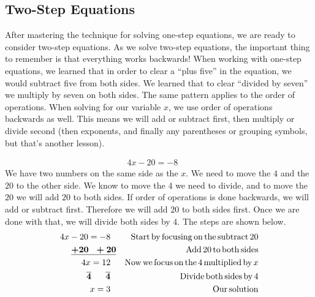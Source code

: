 \subsection{Two-Step Equations}\pp

 {}\pp

 After mastering the technique for solving one-step equations, we are ready to consider two-step equations. As we solve two-step
equations, the important thing to remember is that everything works backwards!
When working with one-step equations, we learned that in order to clear a
``plus five'' in the equation, we would subtract five from both sides. We
learned that to clear ``divided by seven'' we multiply by seven on both sides.
The same pattern applies to the order of operations. When solving for our
variable $x$, we use order of operations backwards as well. This means we will
add or subtract first, then multiply or divide second (then exponents, and
finally any parentheses or grouping symbols, but that's another lesson).

\begin{example}\label{Lin13}
   
  \begin{eqnarray*}
    4 x - 20 = - 8 &  & 
  \end{eqnarray*}
   We have two numbers on the same side as the $x$. We need to move the $4$ and
  the $20$ to the other side. We know to move the $4$ we need to divide, and
  to move the $20$ we will add $20$ to both sides. If order of operations
  is done backwards, we will add or subtract first. Therefore we will add $20$
  to both sides first. Once we are done with that, we will divide both sides
  by $4$. The steps are shown below.
  \begin{eqnarray*}
    4 x - 20 = - 8~~ &  & \operatorname{Start} \operatorname{by} \operatorname{focusing} \operatorname{on}
    \operatorname{the} \operatorname{subtract} 20\\
    \boldsymbol{\underline{+ 20 ~~+ 20}} &  & \operatorname{Add} 20 \operatorname{to} \operatorname{both}
    \operatorname{sides}\\
    4 x = 12~~ &  & \operatorname{Now} \operatorname{we} \operatorname{focus} \operatorname{on} \operatorname{the} 4
    \operatorname{multiplied} \operatorname{by} x\\
    \boldsymbol{\overline{4} ~~~~~ \overline{4}~}~ &  & \operatorname{Divide} \operatorname{both}
    \operatorname{sides} \operatorname{by} 4\\
    x = 3~~ &  & \operatorname{Our} \operatorname{solution}
  \end{eqnarray*}
\end{example}

